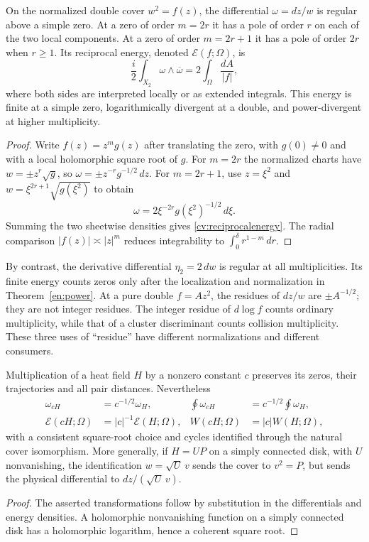 \begin{proposition}\label{cv:poles}
On the normalized double cover $w^2=f(z)$, the differential
$\omega=dz/w$ is regular above a simple zero. At a zero of order
$m=2r$ it has a pole of order $r$ on each of the two local components.
At a zero of order $m=2r+1$ it has a pole of order $2r$ when $r\ge1$.
Its reciprocal energy, denoted $\mathcal E(f;\Omega)$, is
\begin{equation}\label{cv:reciprocalenergy}
 \frac i2\int_{X_2}\omega\wedge\overline\omega
 =2\int_\Omega\frac{dA}{|f|},
\end{equation}
where both sides are interpreted locally or as extended integrals.
This energy is finite at a simple zero, logarithmically divergent at a
double, and power-divergent at higher multiplicity.
\end{proposition}
\begin{proof}
Write $f(z)=z^m g(z)$ after translating the zero, with $g(0)\ne0$ and
with a local holomorphic square root of $g$. For $m=2r$ the normalized
charts have $w=\pm z^r\sqrt g$, so
$\omega=\pm z^{-r}g^{-1/2}\,dz$. For $m=2r+1$, use $z=\xi^2$ and
$w=\xi^{2r+1}\sqrt{g(\xi^2)}$ to obtain
\[
 \omega=2\xi^{-2r}g(\xi^2)^{-1/2}\,d\xi.
\]
Summing the two sheetwise densities gives \eqref{cv:reciprocalenergy}.
The radial comparison $|f(z)|\asymp|z|^m$ reduces integrability to
$\int_0^\delta r^{1-m}\,dr$.
\end{proof}

By contrast, the derivative differential $\eta_2=2\,dw$ is regular at
all multiplicities. Its finite energy counts zeros only after the
localization and normalization in Theorem~\ref{en:power}. At a pure
double $f=Az^2$, the residues of $dz/w$ are
$\pm A^{-1/2}$; they are not integer residues. The integer residue of
$d\log f$ counts ordinary multiplicity, while that of a cluster
discriminant counts collision multiplicity. These three uses of
``residue'' have different normalizations and different consumers.

\begin{proposition}\label{cv:amplitude}
Multiplication of a heat field $H$ by a nonzero constant $c$ preserves
its zeros, their trajectories and all pair distances. Nevertheless
\begin{align*}
 \omega_{cH}&=c^{-1/2}\omega_H,&
 \oint\omega_{cH}&=c^{-1/2}\oint\omega_H,\\
 \mathcal E(cH;\Omega)&=|c|^{-1}\mathcal E(H;\Omega),&
 W(cH;\Omega)&=|c|W(H;\Omega),
\end{align*}
with a consistent square-root choice and cycles identified through the natural cover isomorphism. More generally, if $H=UP$ on a
simply connected disk, with $U$ nonvanishing, the identification
$w=\sqrt U\,v$ sends the cover to $v^2=P$, but sends the physical
differential to $dz/(\sqrt U\,v)$.
\end{proposition}
\begin{proof}
The asserted transformations follow by substitution in the differentials
and energy densities. A holomorphic nonvanishing function on a simply
connected disk has a holomorphic logarithm, hence a coherent square root.
\end{proof}

